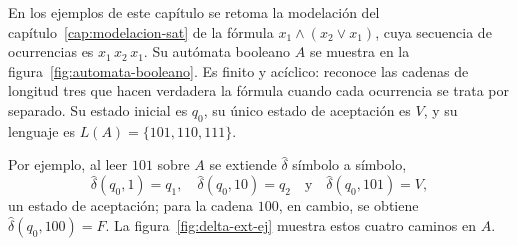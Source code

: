 \documentclass{report}
\theoremstyle{definition}
\theoremstyle{plain}
\begin{document}
En los ejemplos de este capítulo se retoma la modelación del
capítulo~\ref{cap:modelacion-sat} de la fórmula
$x_1 \wedge (x_2 \vee x_1)$, cuya secuencia de ocurrencias es
$x_1\,x_2\,x_1$. Su autómata booleano $A$ se muestra en la
figura~\ref{fig:automata-booleano}. Es finito y acíclico: reconoce las
cadenas de longitud tres que hacen verdadera la fórmula cuando cada
ocurrencia se trata por separado. Su estado inicial es $q_0$, su único
estado de aceptación es $V$, y su lenguaje es $L(A) = \{101, 110, 111\}$.

Por ejemplo, al leer $101$ sobre $A$ se extiende $\hat\delta$ símbolo a
símbolo,
\[
  \hat\delta(q_0, 1) = q_1, \quad \hat\delta(q_0, 10) = q_2 \quad\text{y}\quad
  \hat\delta(q_0, 101) = V,
\]
un estado de aceptación; para la cadena $100$, en cambio, se obtiene
$\hat\delta(q_0, 100) = F$. La figura~\ref{fig:delta-ext-ej} muestra
estos cuatro caminos en $A$.
\end{document}
